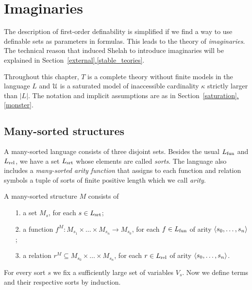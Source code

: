 \documentclass[creche.tex]{subfiles}
\begin{document}
\chapter{Imaginaries}
\label{imaginary}


\def\medrel#1{\parbox[t]{6ex}{$\displaystyle\hfil #1$}}
\def\ceq#1#2#3{\parbox[t]{25ex}{$\displaystyle #1$}\medrel{#2}{$\displaystyle #3$}}


\def\vl{\mr}

The description of first-order definability is simplified if we find a way to use definable sets as parameters in formulas.
This leads to the theory of \textit{imaginaries}.
The technical reason that induced Shelah to introduce imaginaries will be explained in Section~\hyperref[stable_teories]{\ref*{external}.\ref*{stable_teories}}.

Throughout this chapter, $T$ is a complete theory without finite models in the language $L$ and $\EuScript U$ is a saturated model of inaccessible cardinality $\kappa$ strictly larger than $|L|$.
The notation and implicit assumptions are as in Section~\hyperref[monster]{\ref*{saturation}.\ref*{monster}}.

\section{Many-sorted structures}
\label{many-sorted}
\def\Ar{{\rm Ar}}

A many-sorted language consists of three disjoint sets.
Besides the usual $L_{\rm fun}$ and $L_{\rm rel}$, we have a set $L_{\rm srt}$  whose elements are called \emph{sorts}.
The language also includes a \emph{many-sorted arity function} that assigns to each function and relation symbols a tuple of sorts of finite positive length which we call \emph{arity}.

A many-sorted structure $M$ consists of
\begin{itemize}
\item[1.] a set $M_s$, for each $s\in L_{\rm srt}$;
\item[2.] a function $f^M:M_{s_1}\times\dots\times M_{s_n}\to M_{s_0}$, for each $f\in L_{\rm fun}$ of arity $\langle s_0,\dots,s_n\rangle$;
\item[3.] a relation $r^M\subseteq M_{s_0}\times\dots\times M_{s_n}$, for each $r\in L_{\rm rel}$ of arity $\langle s_0,\dots,s_n\rangle$.
\end{itemize}

For every sort $s$ we fix a sufficiently large set of variables $V_s$.
Now we define terms and their respective sorts by induction.
\end{document}
